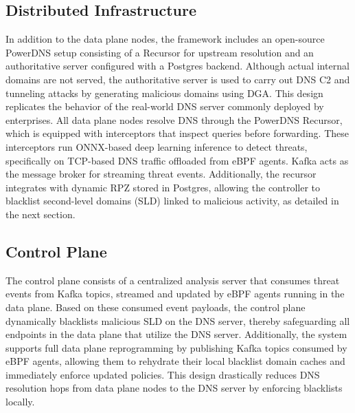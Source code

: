\documentclass [11pt, proquest] {uwthesis}[2020/02/24]
\begin{document}
\subsection{Distributed Infrastructure}
In addition to the data plane nodes, the framework includes an open-source PowerDNS setup consisting of a Recursor for upstream resolution and an authoritative server configured with a Postgres backend. Although actual internal domains are not served, the authoritative server is used to carry out DNS C2 and tunneling attacks by generating malicious domains using DGA. This design replicates the behavior of the real-world DNS server commonly deployed by enterprises.
All data plane nodes resolve DNS through the PowerDNS Recursor, which is equipped with interceptors that inspect queries before forwarding. These interceptors run ONNX-based deep learning inference to detect threats, specifically on TCP-based DNS traffic offloaded from eBPF agents. Kafka acts as the message broker for streaming threat events. Additionally, the recursor integrates with dynamic RPZ stored in Postgres, allowing the controller to blacklist second-level domains (SLD) linked to malicious activity, as detailed in the next section.

\subsection{Control Plane}
The control plane consists of a centralized analysis server that consumes threat events from Kafka topics, streamed and updated by eBPF agents running in the data plane. Based on these consumed event payloads, the control plane dynamically blacklists malicious SLD on the DNS server, thereby safeguarding all endpoints in the data plane that utilize the DNS server. Additionally, the system supports full data plane reprogramming by publishing Kafka topics consumed by eBPF agents, allowing them to rehydrate their local blacklist domain caches and immediately enforce updated policies. This design drastically reduces DNS resolution hops from data plane nodes to the DNS server by enforcing blacklists locally.
\end{document}

